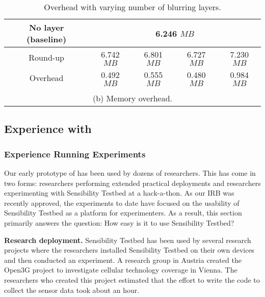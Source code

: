 \begin{table}
\begin{tabular}{|l|l|c|c|c|c|}
\multicolumn{2}{|c|}{No layer (baseline)} & \multicolumn{4}{c|}{6.246 $MB$} \\\hline

\multicolumn{2}{|c|}{Round-up} & 6.742 $MB$ & 6.801 $MB$ & 6.727 $MB$ & 7.230 $MB$ \\\hline

\multicolumn{2}{|c|}{Overhead} & 0.492 $MB$ & 0.555 $MB$ & 0.480 $MB$ & 0.984 $MB$ \\\hline
\multicolumn{6}{c}{\vspace{-0.1cm}}\\

\multicolumn{6}{c}{\small (b) Memory overhead.} \\
\end{tabular}

\egroup

\caption{\small Overhead with varying number of blurring layers. }
\label{tab:overhead}
\end{table}



\subsection{Experience with \sysname}\label{sec-deployment}


\subsubsection{Experience Running Experiments}\label{sec-external}

Our early prototype of \sysname has been used by dozens of researchers.
This has come in two forms: researchers performing extended practical
deployments and researchers experimenting with Sensibility Testbed at a 
hack-a-thon.  As our IRB was recently approved, the experiments to date have 
focused on the usability of Sensibility Testbed as a platform for 
experimenters.
As a result, this section primarily answers the question: How easy is it to
use Sensibility Testbed?

{\bf Research deployment.}  Sensibility Testbed has been used by 
several research projects where the researchers installed Sensibility
Testbed on their own devices and then conducted an experiment.  
A research group in Austria created the Open3G \cite{open3g} project to
investigate cellular technology coverage in Vienna.  The researchers
who created this project estimated that the effort to write the code to
collect the sensor data took about an hour.

